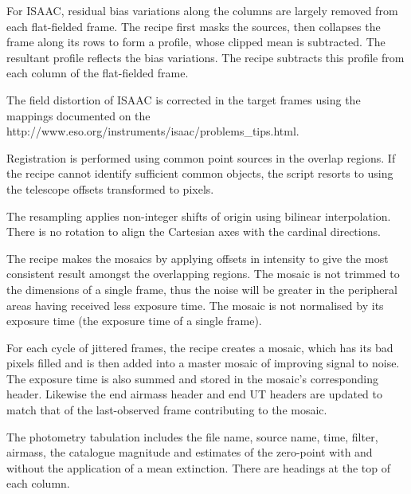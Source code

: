 \documentclass[twoside,11pt,nolof]{starlink}
\begin{document}
{{{         \sstitem
         For ISAAC, residual bias variations along the columns are
         largely removed from each flat-fielded frame.  The recipe first
         masks the sources, then collapses the frame along its rows to form
         a profile, whose clipped mean is subtracted.  The resultant profile
         reflects the bias variations.  The recipe subtracts this profile
         from each column of the flat-fielded frame.

         \sstitem
         The field distortion of ISAAC is corrected in the target frames
         using the mappings documented on the
         {http://www.eso.org/instruments/isaac/problems_tips.html}.

         \sstitem
         Registration is performed using common point sources in the
         overlap regions.  If the recipe cannot identify sufficient common
         objects, the script resorts to using the telescope offsets
         transformed to pixels.

         \sstitem
         The resampling applies non-integer shifts of origin using
         bilinear interpolation.  There is no rotation to align the
         Cartesian axes with the cardinal directions.

         \sstitem
         The recipe makes the mosaics by applying offsets in intensity
         to give the most consistent result amongst the overlapping regions.
         The mosaic is not trimmed to the dimensions of a single frame, thus
         the noise will be greater in the peripheral areas having received
         less exposure time.  The mosaic is not normalised by its exposure
         time (the exposure time of a single frame).

         \sstitem
         For each cycle of jittered frames, the recipe creates a mosaic,
         which has its bad pixels filled and is then added into a master
         mosaic of improving signal to noise.  The exposure time is also
         summed and stored in the mosaic's corresponding header.  Likewise
         the end airmass header and end UT headers are updated to match that
         of the last-observed frame contributing to the mosaic.

         \sstitem
         The photometry tabulation includes the file name, source name,
         time, filter, airmass, the catalogue magnitude and estimates of
         the zero-point with and without the application of a mean
         extinction.  There are headings at the top of each column.

}}}
\end{document}
